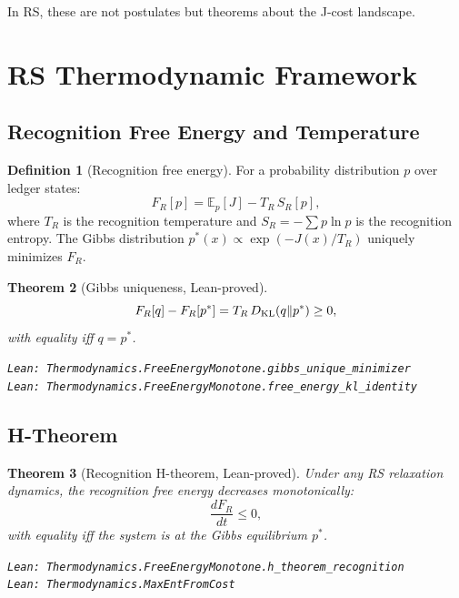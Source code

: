 \documentclass[12pt,a4paper]{article}
\newtheorem{theorem}{Theorem}[section]
\theoremstyle{definition}
\newtheorem{definition}[theorem]{Definition}
\theoremstyle{remark}
\begin{document}
In RS, these are not postulates but theorems about the J-cost landscape.

\section{RS Thermodynamic Framework}

\subsection{Recognition Free Energy and Temperature}

\begin{definition}[Recognition free energy]
For a probability distribution $p$ over ledger states:
\begin{equation}
  F_R[p] = \mathbb{E}_p[J] - T_R\,S_R[p],
\end{equation}
where $T_R$ is the recognition temperature and $S_R = -\sum p\ln p$
is the recognition entropy.  The Gibbs distribution $p^*(x) \propto
\exp(-J(x)/T_R)$ uniquely minimizes $F_R$.
\end{definition}

\begin{theorem}[Gibbs uniqueness, Lean-proved]\label{thm:gibbs}
\begin{equation}
  F_R[q] - F_R[p^*] = T_R\,D_{\rm KL}(q \| p^*) \geq 0,
\end{equation}
with equality iff $q = p^*$.

\texttt{Lean: Thermodynamics.FreeEnergyMonotone.gibbs\_unique\_minimizer}\\
\texttt{Lean: Thermodynamics.FreeEnergyMonotone.free\_energy\_kl\_identity}
\end{theorem}

\subsection{H-Theorem}

\begin{theorem}[Recognition H-theorem, Lean-proved]\label{thm:htheorem}
Under any RS relaxation dynamics, the recognition free energy decreases
monotonically:
\begin{equation}
  \frac{dF_R}{dt} \leq 0,
\end{equation}
with equality iff the system is at the Gibbs equilibrium $p^*$.

\texttt{Lean: Thermodynamics.FreeEnergyMonotone.h\_theorem\_recognition}\\
\texttt{Lean: Thermodynamics.MaxEntFromCost}
\end{theorem}
\end{document}
